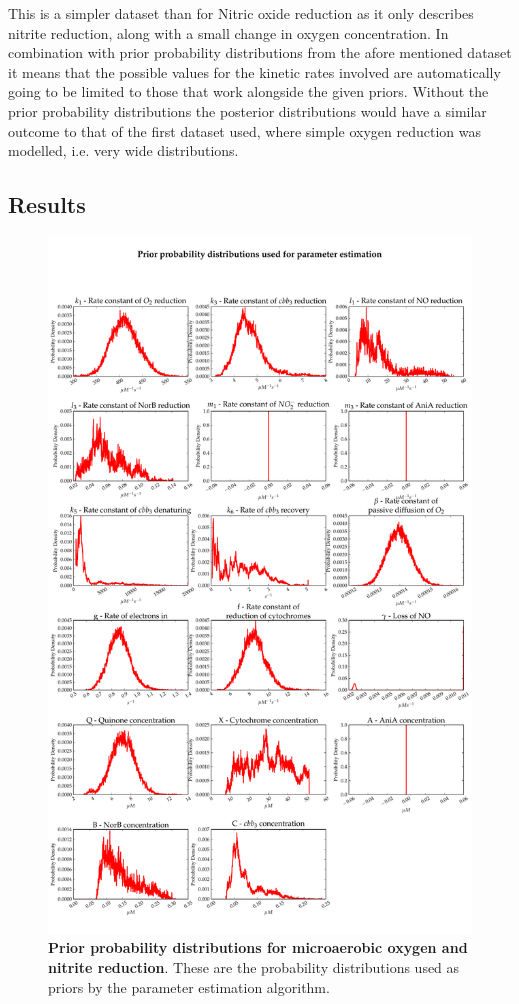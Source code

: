 This is a simpler dataset than for Nitric oxide reduction as it only describes nitrite reduction, along with a small change in oxygen concentration. In combination with prior probability distributions from the afore mentioned dataset it means that the possible values for the kinetic rates involved are automatically going to be limited to those that work alongside the given priors. Without the prior probability distributions the posterior distributions would have a similar outcome to that of the first dataset used, where simple oxygen reduction was modelled, i.e. very wide distributions.
\subsection{Results}
\begin{figure}[tbp]
 \centering
 \includegraphics[width=15cm, trim=0cm 0cm 0cm 0cm]{./07-nitritereduction/data/priors1.pdf}
 \caption[Prior probability distributions for microaerobic oxygen and nitrite reduction]{{\bf Prior probability distributions for microaerobic oxygen and nitrite reduction}. These are the probability distributions used as priors by the parameter estimation algorithm.
 \label{fig:nitrite_priors1}}
\end{figure}
